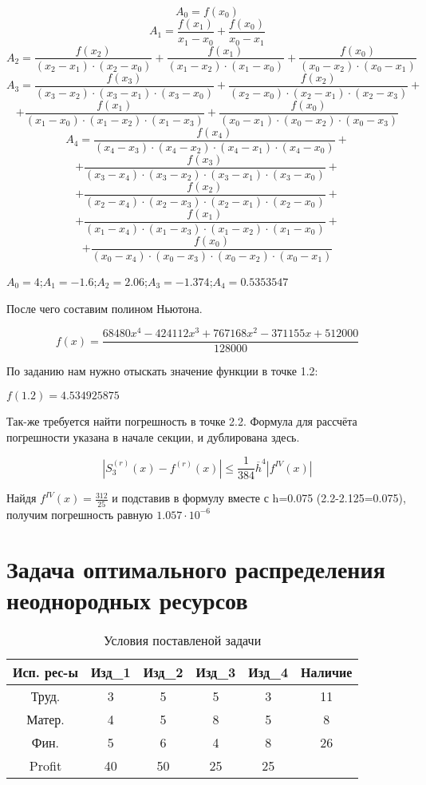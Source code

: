 \documentclass[russian,utf8,nocolumnxxxi,nocolumnxxxii]{eskdtext}
\begin{document}
   $$A_0=f(x_0)$$
   \vspace{20pt}
   $$A_1=\frac{f(x_1)}{x_1-x_0}+\frac{f(x_0)}{x_0-x_1}$$
   \vspace{20pt}
   $$A_2=\frac{f(x_2)}{(x_2-x_1) \cdot (x_2-x_0)} + \frac{f(x_1)}{(x_1-x_2) \cdot (x_1-x_0)} + \frac{f(x_0)}{(x_0-x_2) \cdot (x_0-x_1)}$$
   \vspace{20pt}
   $$A_3=\frac{f(x_3)}{(x_3-x_2) \cdot (x_3-x_1) \cdot (x_3-x_0)} + \frac{f(x_2)}{(x_2-x_0) \cdot (x_2-x_1) \cdot (x_2-x_3)} +$$ 
   $$+ \frac{f(x_1)}{(x_1-x_0) \cdot (x_1-x_2) \cdot (x_1-x_3)} + \frac{f(x_0)}{(x_0-x_1) \cdot (x_0-x_2) \cdot (x_0-x_3)}$$
   \vspace{20pt}
   $$A_4=\frac{f(x_4)}{(x_4-x_3) \cdot (x_4-x_2) \cdot (x_4-x_1) \cdot (x_4-x_0)} +$$
   $$+ \frac{f(x_3)}{(x_3-x_4) \cdot (x_3-x_2) \cdot (x_3-x_1) \cdot (x_3-x_0)} +$$
   $$+ \frac{f(x_2)}{(x_2-x_4) \cdot (x_2-x_3) \cdot (x_2-x_1) \cdot (x_2-x_0)} +$$
   $$+ \frac{f(x_1)}{(x_1-x_4) \cdot (x_1-x_3) \cdot (x_1-x_2) \cdot (x_1-x_0)} +$$
   $$+ \frac{f(x_0)}{(x_0-x_4) \cdot (x_0-x_3) \cdot (x_0-x_2) \cdot (x_0-x_1)}$$
   
   \vspace{20pt}
   
   $A_0=4$;$A_1=-1.6$;$A_2=2.06$;$A_3=-1.374$;$A_4=0.5353547$
   
   \newpage
   
   После чего составим полином Ньютона.
   
   $$f(x)=\frac{68480x^4-424112x^3+767168x^2-371155x+512000}{128000}$$
   
   По заданию нам нужно отыскать значение функции в точке 1.2:
   
   $f(1.2)=4.534925875$
   
   Так-же требуется найти погрешность в точке 2.2. Формула для рассчёта погрешности указана в начале секции, и дублирована здесь.
   
    $$|S_3^{(r)}(x)-f^{(r)}(x)|\leqslant \frac{1}{384}\overline{h}^4|f^{IV}(x)|$$
    
    Найдя $f^{IV}(x) = \frac{312}{25}$ и подставив в формулу вместе с h=0.075 (2.2-2.125=0.075), получим погрешность равную $1.057 \cdot 10^{-6}$
    
    \newpage
    \section{Задача оптимального распределения неоднородных ресурсов}
    \begin{table}[h]
        \centering
     \caption{Условия поставленой задачи}
\begin{tabular}[c]{|*{6}{c|}}
\hline
Исп. рес-ы & Изд_1 & Изд_2 & Изд_3 & Изд_4 & Наличие\\
\hline
Труд. & 3 & 5 & 5 & 3 & 11\\
\hline
Матер. & 4 & 5 & 8 & 5 & 8\\
\hline
Фин. & 5 & 6 & 4 & 8 & 26\\
\hline
Profit & 40 & 50 & 25 & 25\\
\hline
\end{tabular}
\end{table}
\end{document}
